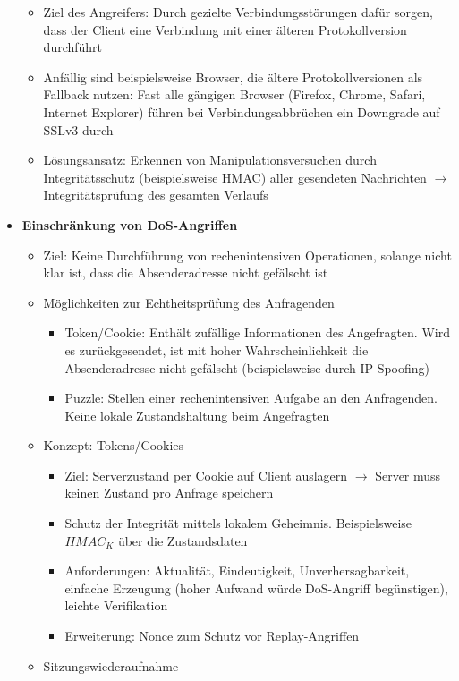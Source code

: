 \begin{itemize}
	\begin{itemize}
		\item Ziel des Angreifers: Durch gezielte Verbindungsstörungen dafür sorgen, dass der Client eine Verbindung mit einer älteren Protokollversion durchführt
		\item Anfällig sind beispielsweise Browser, die ältere Protokollversionen als Fallback nutzen: Fast alle gängigen Browser (Firefox, Chrome, Safari, Internet Explorer) führen bei Verbindungsabbrüchen ein Downgrade auf SSLv3 durch
		\item Lösungsansatz: Erkennen von Manipulationsversuchen durch Integritätsschutz (beispielsweise HMAC) aller gesendeten Nachrichten \(\rightarrow\) Integritätsprüfung des gesamten Verlaufs
	\end{itemize}
	\item \textbf{Einschränkung von DoS-Angriffen}
	\begin{itemize}
		\item Ziel: Keine Durchführung von rechenintensiven Operationen, solange nicht klar ist, dass die Absenderadresse nicht gefälscht ist
		\item Möglichkeiten zur Echtheitsprüfung des Anfragenden
		\begin{itemize}
			\item Token/Cookie: Enthält zufällige Informationen des Angefragten. Wird es zurückgesendet, ist mit hoher Wahrscheinlichkeit die Absenderadresse nicht gefälscht (beispielsweise durch IP-Spoofing)
			\item Puzzle: Stellen einer rechenintensiven Aufgabe an den Anfragenden. Keine lokale Zustandshaltung beim Angefragten
		\end{itemize}
		\item Konzept: Tokens/Cookies
		\begin{itemize}
			\item Ziel: Serverzustand per Cookie auf Client auslagern \(\rightarrow\) Server muss keinen Zustand pro Anfrage speichern
			\item Schutz der Integrität mittels lokalem Geheimnis. Beispielsweise \(HMAC_K\) über die Zustandsdaten
			\item Anforderungen: Aktualität, Eindeutigkeit, Unverhersagbarkeit, einfache Erzeugung (hoher Aufwand würde DoS-Angriff begünstigen), leichte Verifikation
			\item Erweiterung: Nonce zum Schutz vor Replay-Angriffen
		\end{itemize}
		\item Sitzungswiederaufnahme

\end{itemize}
\end{itemize}
